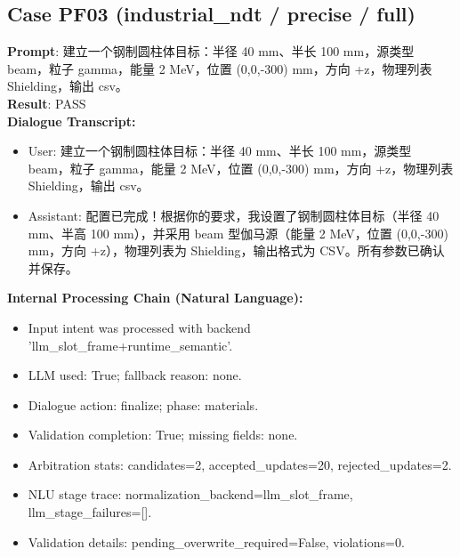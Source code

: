 \documentclass[11pt]{ctexart}
\begin{document}
\subsection{Case PF03 (industrial\_ndt / precise / full)}
\textbf{Prompt}: 建立一个钢制圆柱体目标：半径 40 mm、半长 100 mm，源类型 beam，粒子 gamma，能量 2 MeV，位置 (0,0,-300) mm，方向 +z，物理列表 Shielding，输出 csv。\\
\textbf{Result}: PASS\\
\textbf{Dialogue Transcript:}
\begin{itemize}
\item User: 建立一个钢制圆柱体目标：半径 40 mm、半长 100 mm，源类型 beam，粒子 gamma，能量 2 MeV，位置 (0,0,-300) mm，方向 +z，物理列表 Shielding，输出 csv。
\item Assistant: 配置已完成！根据你的要求，我设置了钢制圆柱体目标（半径 40 mm、半高 100 mm），并采用 beam 型伽马源（能量 2 MeV，位置 (0,0,-300) mm，方向 +z），物理列表为 Shielding，输出格式为 CSV。所有参数已确认并保存。
\end{itemize}
\textbf{Internal Processing Chain (Natural Language):}
\begin{itemize}
\item Input intent was processed with backend 'llm\_slot\_frame+runtime\_semantic'.
\item LLM used: True; fallback reason: none.
\item Dialogue action: finalize; phase: materials.
\item Validation completion: True; missing fields: none.
\item Arbitration stats: candidates=2, accepted\_updates=20, rejected\_updates=2.
\item NLU stage trace: normalization\_backend=llm\_slot\_frame, llm\_stage\_failures=[].
\item Validation details: pending\_overwrite\_required=False, violations=0.
\end{itemize}
\end{document}
